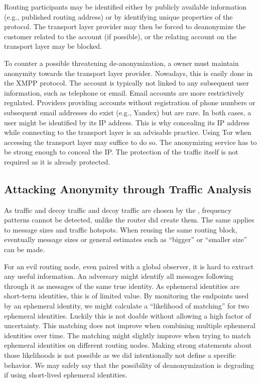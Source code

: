 Routing participants may be identified either by publicly available information (e.g., published routing address) or by identifying unique properties of the protocol. The transport layer provider may then be forced to deanonymize the customer related to the account (if possible), or the relating account on the transport layer may be blocked. 

To counter a possible threatening de-anonymization, a \VortexNode{} owner must maintain anonymity towards the transport layer provider. Nowadays, this is easily done in the XMPP protocol. The account is typically not linked to any subsequent user information, such as telephone or email. Email accounts are more restrictively regulated. Providers providing accounts without registration of phone numbers or subsequent email addresses do exist (e.g., Yandex) but are rare. In both cases, a user might be identified by its IP address. This is why concealing its IP address while connecting to the transport layer is an advisable practice. Using Tor when accessing the transport layer may suffice to do so. The anonymizing service has to be strong enough to conceal the IP. The protection of the traffic itself is not required as it is already protected.

\subsection{Attacking Anonymity through Traffic Analysis}
As traffic and decoy traffic and decoy traffic are chosen by the , frequency patterns cannot be detected, unlike the router did create them. The same applies to message sizes and traffic hotspots. When reusing the same routing block, eventually message sizes or general estimates such as ``bigger'' or ``smaller size'' can be made.

For an evil routing node, even paired with a global observer, it is hard to extract any useful information. An adversary might identify all messages following through it as messages of the same true identity. As ephemeral identities are short-term identities, this is of limited value. By monitoring the endpoints used by an ephemeral identity, we might calculate a ``likelihood of matching'' for two ephemeral identities. Luckily this is not doable without allowing a high factor of uncertainty. This matching does not improve when combining multiple ephemeral identities over time. The matching might slightly improve when trying to match ephemeral identities on different routing nodes. Making strong statements about those likelihoods is not possible as we did intentionally not define a specific behavior. We may safely say that the possibility of deanonymization is degrading if using short-lived ephemeral identities.

